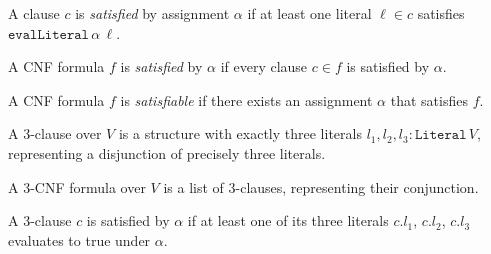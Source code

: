\begin{definition}
\label{ThreeSATToClique.clauseSatisfied}
\leanok
{}
A clause $c$ is \emph{satisfied} by assignment $\alpha$ if at least one literal
$\ell \in c$ satisfies $\mathtt{evalLiteral}\,\alpha\,\ell$.
\end{definition}

\begin{definition}
\label{ThreeSATToClique.formulaSatisfied}
\leanok
{}
A CNF formula $f$ is \emph{satisfied} by $\alpha$ if every clause $c \in f$ is
satisfied by $\alpha$.
\end{definition}

\begin{definition}
\label{ThreeSATToClique.isSatisfiable}
\leanok
{}
A CNF formula $f$ is \emph{satisfiable} if there exists an assignment $\alpha$
that satisfies $f$.
\end{definition}

\begin{definition}[3-clause]
\label{ThreeSATToClique.Clause3}
\leanok
{}
A 3-clause over $V$ is a structure with exactly three literals $l_1, l_2, l_3 :
\mathtt{Literal}\,V$, representing a disjunction of precisely three literals.
\end{definition}

\begin{definition}
\label{ThreeSATToClique.Formula3}
\leanok
{}
A 3-CNF formula over $V$ is a list of 3-clauses, representing their conjunction.
\end{definition}

\begin{definition}
\label{ThreeSATToClique.clause3Satisfied}
\leanok
{}
A 3-clause $c$ is satisfied by $\alpha$ if at least one of its three literals
$c.l_1$, $c.l_2$, $c.l_3$ evaluates to true under $\alpha$.
\end{definition}

